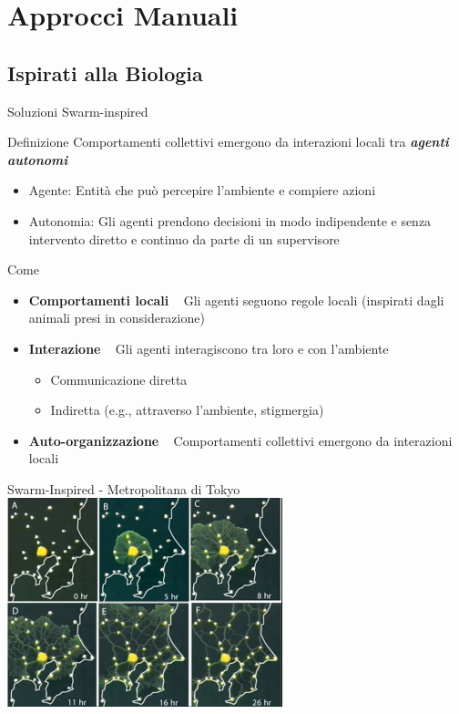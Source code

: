 \documentclass[presentation, 10pt,aspectratio=169]{beamer}\mode<presentation>{\usetheme{AMSBolognaFC}}
\begin{document}
\section{Approcci Manuali}


\subsection{Ispirati alla Biologia}

\begin{frame}{Soluzioni Swarm-inspired}
	\begin{exampleblock}{Definizione}
		Comportamenti collettivi \alert{emergono} da interazioni locali tra \emph{\textbf{agenti autonomi}}
		\begin{itemize}
			\item Agente: Entità che può percepire l'ambiente e compiere azioni
			\item Autonomia: Gli agenti prendono decisioni in modo indipendente e senza intervento diretto e continuo da parte di un supervisore
		\end{itemize}
	\end{exampleblock}
	\begin{block}{Come}
		\begin{itemize}
			\item \textbf{Comportamenti locali} \faArrowRight ~ Gli agenti seguono regole locali (inspirati dagli animali presi in considerazione)
			\item \textbf{Interazione} \faArrowRight ~ Gli agenti interagiscono tra loro e con l'ambiente
			\begin{itemize}
				\item Communicazione diretta 
				\item Indiretta (e.g., attraverso l'ambiente, stigmergia)
			\end{itemize}
			\item \textbf{Auto-organizzazione} \faArrowRight ~ Comportamenti collettivi emergono da interazioni locali
		\end{itemize}
	\end{block}
\end{frame}
\begin{frame}{Swarm-Inspired - Metropolitana di Tokyo}
	\centering
	\href{https://www.youtube.com/shorts/GwKuFREOgmo}{\includegraphics[width=0.6\textwidth]{img/metro-tokyo.png}}
\end{frame}
\end{document}
